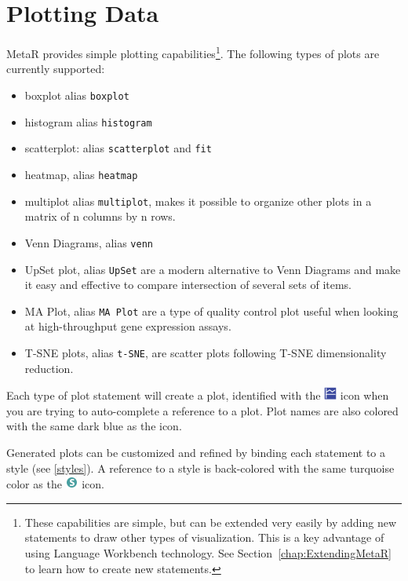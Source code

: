 \section{Plotting Data}
MetaR provides simple plotting capabilities\footnote{These capabilities are simple, but can be extended very easily by adding new statements to draw other types of visualization. This is a key advantage of using Language Workbench technology. See Section~\ref{chap:ExtendingMetaR} to learn how to create new statements.}. The following types of plots are currently supported: 
\begin{itemize}
  \item boxplot alias \texttt{boxplot}
  \item histogram alias \texttt{histogram}
  \item scatterplot: alias \texttt{scatterplot} and \texttt{fit}
  \item heatmap, alias \texttt{heatmap}

  \item multiplot alias \texttt{multiplot}, makes it possible to organize other plots in a matrix of n columns by n rows.
  \item Venn Diagrams, alias \texttt{venn}
  \item  UpSet plot, alias \texttt{UpSet} are a modern alternative to Venn Diagrams and make it easy and effective to compare intersection of several sets of items. 
  \item MA Plot, alias \texttt{MA Plot} are a type of quality control plot useful when looking at high-throughput gene expression assays.
  \item T-SNE plots, alias \texttt{t-SNE}, are scatter plots following T-SNE dimensionality reduction.
\end{itemize}
Each type of plot statement will create a plot, identified with the \includegraphics[height=2ex]{figures/plot.png} icon when you are trying to auto-complete a reference to a plot. Plot names are also colored with the same dark blue as the icon.

Generated plots can be customized and refined by binding each statement to a style (see \ref{styles}). A reference to a style is back-colored with the same turquoise color as the  \includegraphics[height=2ex]{figures/style.png} icon.

